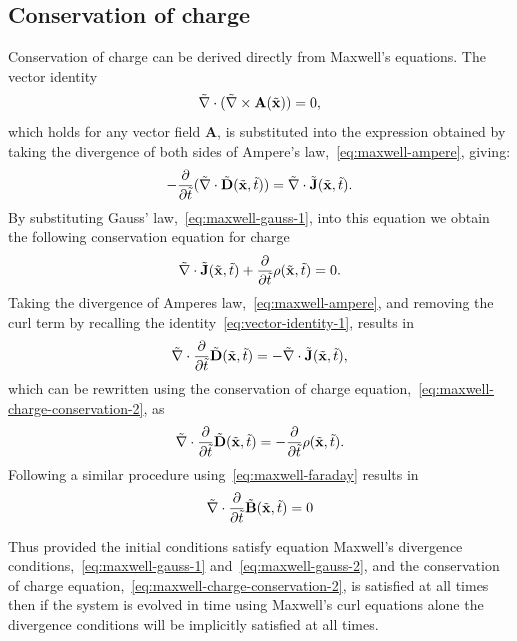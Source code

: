 \subsection{Conservation of charge}
Conservation of charge can be derived directly from Maxwell's equations. The
vector identity
\begin{equation}
  \label{eq:vector-identity-1}
  \tilde{\nabla} \cdot ( \tilde{\nabla} \times \mathbf{A} (\tilde{\mathbf{x}}) ) = 0,
\end{equation}
which holds for any vector field $\mathbf{A}$, is substituted into the
expression obtained by taking the divergence of both sides of Ampere's
law,~\eqref{eq:maxwell-ampere}, giving:
$$
- \frac{\partial}{\partial \tilde{t} } ( \tilde{\nabla} \cdot \tilde{\mathbf{D}}(\tilde{\mathbf{x}},\tilde{t}) ) = \tilde{\nabla} \cdot
\tilde{\mathbf{J}}(\tilde{\mathbf{x}},\tilde{t}) .
$$
By substituting Gauss' law,~\eqref{eq:maxwell-gauss-1}, into this equation we
obtain the following conservation equation for charge
\begin{equation}
  \label{eq:maxwell-charge-conservation-2}
  \tilde{\nabla} \cdot \tilde{\mathbf{J}}(\tilde{\mathbf{x}},\tilde{t}) + \frac{\partial}{\partial \tilde{t} } \rho (\tilde{\mathbf{x}},\tilde{t}) = 0 .
\end{equation}
Taking the divergence of Amperes law,~\eqref{eq:maxwell-ampere}, and removing
the curl term by recalling the identity~\eqref{eq:vector-identity-1}, results in
$$
\tilde{\nabla} \cdot \frac{\partial}{\partial \tilde{t} }  \tilde{\mathbf{D}}(\tilde{\mathbf{x}}, \tilde{t}) = - \tilde{\nabla} \cdot
\tilde{\mathbf{J}}(\tilde{\mathbf{x}},\tilde{t}),
$$
which can be rewritten using the conservation of charge
equation,~\eqref{eq:maxwell-charge-conservation-2}, as
$$
\tilde{\nabla} \cdot \frac{\partial}{\partial \tilde{t} } \tilde{\mathbf{D}}(\tilde{\mathbf{x}}, \tilde{t}) = - \frac{\partial}{\partial \tilde{t} }  \rho
  (\tilde{\mathbf{x}},\tilde{t}).
$$
Following a similar procedure using~\eqref{eq:maxwell-faraday} results in
$$
\tilde{\nabla} \cdot \frac{\partial}{\partial \tilde{t} }  \tilde{\mathbf{B}}(\tilde{\mathbf{x}}, \tilde{t}) = 0
$$

Thus provided the initial conditions satisfy equation Maxwell's divergence
conditions,~\eqref{eq:maxwell-gauss-1} and~\eqref{eq:maxwell-gauss-2}, and the
conservation of charge equation,~\eqref{eq:maxwell-charge-conservation-2}, is
satisfied at all times then if the system is evolved in time using Maxwell's
curl equations alone the divergence conditions will be implicitly satisfied at
all times.

